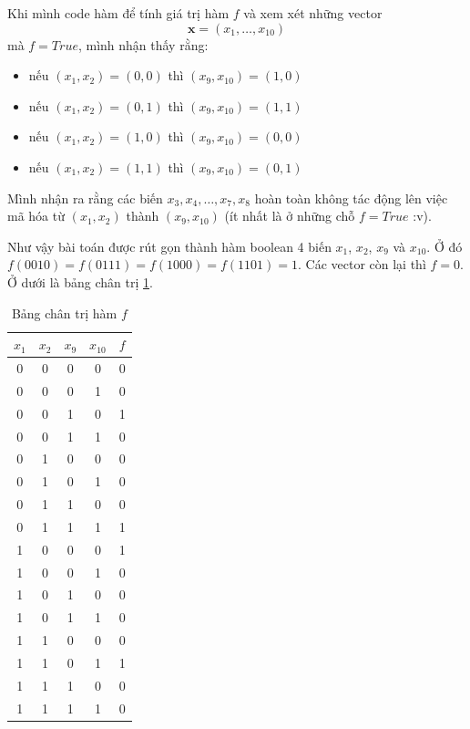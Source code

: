 Khi mình code hàm để tính giá trị hàm $f$ và xem xét những vector \[ \bm{x} = (x_1, \ldots, x_{10}) \] mà $f = True$, mình nhận thấy rằng:

\begin{itemize}
    \item nếu $(x_1, x_2) = (0, 0)$ thì $(x_9, x_{10}) = (1, 0)$
    \item nếu $(x_1, x_2) = (0, 1)$ thì $(x_9, x_{10}) = (1, 1)$
    \item nếu $(x_1, x_2) = (1, 0)$ thì $(x_9, x_{10}) = (0, 0)$
    \item nếu $(x_1, x_2) = (1, 1)$ thì $(x_9, x_{10}) = (0, 1)$
\end{itemize}

Mình nhận ra rằng các biến $x_3, x_4, \ldots, x_7, x_8$ hoàn toàn không tác động lên việc mã hóa từ $(x_1, x_2)$ thành $(x_9, x_{10})$ (ít nhất là ở những chỗ $f = True$ :v).

Như vậy bài toán được rút gọn thành hàm boolean 4 biến $x_1$, $x_2$, $x_9$ và $x_{10}$. Ở đó $f(0010) = f(0111) = f(1000) = f(1101) = 1$. Các vector còn lại thì $f=0$. Ở dưới là bảng chân trị \ref{nsucrypto23:prob11}.

\begin{table}[ht]
    \centering
    \begin{tabular}{|c|c|c|c|c|}
        \hline
        $x_1$ & $x_2$ & $x_9$ & $x_{10}$ & $f$ \\ \hline
        0 & 0 & 0 & 0 & 0 \\ \hline
        0 & 0 & 0 & 1 & 0 \\ \hline
        0 & 0 & 1 & 0 & 1 \\ \hline
        0 & 0 & 1 & 1 & 0 \\ \hline
        0 & 1 & 0 & 0 & 0 \\ \hline
        0 & 1 & 0 & 1 & 0 \\ \hline
        0 & 1 & 1 & 0 & 0 \\ \hline
        0 & 1 & 1 & 1 & 1 \\ \hline
        1 & 0 & 0 & 0 & 1 \\ \hline
        1 & 0 & 0 & 1 & 0 \\ \hline
        1 & 0 & 1 & 0 & 0 \\ \hline
        1 & 0 & 1 & 1 & 0 \\ \hline
        1 & 1 & 0 & 0 & 0 \\ \hline
        1 & 1 & 0 & 1 & 1 \\ \hline
        1 & 1 & 1 & 0 & 0 \\ \hline
        1 & 1 & 1 & 1 & 0 \\ \hline
    \end{tabular}
    \caption{Bảng chân trị hàm $f$}
    \label{nsucrypto23:prob11}
\end{table}

